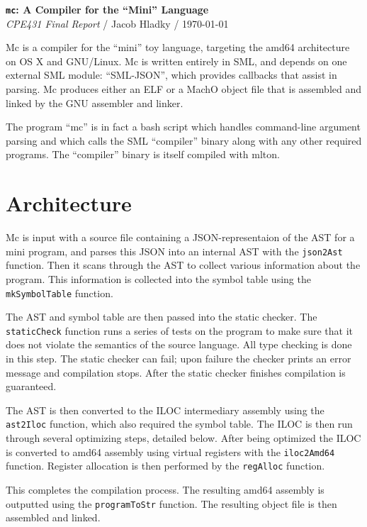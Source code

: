 \documentclass[12pt]{article}
\begin{document}
{\centering\Large
  \textbf{\texttt{mc}: A Compiler for the ``Mini'' Language}\\
         {\normalsize{\em CPE431 Final Report} / Jacob Hladky / \today}
         \par
}

\vspace{0.5cm}

Mc is a compiler for the ``mini'' toy language, targeting the amd64 architecture on OS X and GNU/Linux. Mc is written entirely in SML, and depends on one external SML module: ``SML-JSON'', which provides callbacks that assist in parsing. Mc produces either an ELF or a MachO object file that is assembled and linked by the GNU assembler and linker.

The program ``mc'' is in fact a bash script which handles command-line argument parsing and which calls the SML ``compiler'' binary along with any other required programs. The ``compiler'' binary is itself compiled with mlton.

\section*{Architecture}
Mc is input with a source file containing a JSON-representaion of the AST for a mini program, and parses this JSON into an internal AST with the \texttt{json2Ast} function. Then it scans through the AST to collect various information about the program. This information is collected into the symbol table using the \texttt{mkSymbolTable} function.

The AST and symbol table are then passed into the static checker. The \texttt{staticCheck} function runs a series of tests on the program to make sure that it does not violate the semantics of the source language. All type checking is done in this step. The static checker can fail; upon failure the checker prints an error message and compilation stops. After the static checker finishes compilation is guaranteed.

The AST is then converted to the ILOC intermediary assembly using the \texttt{ast2Iloc} function, which also required the symbol table. The ILOC is then run through several optimizing steps, detailed below. After being optimized the ILOC is converted to amd64 assembly using virtual registers with the \texttt{iloc2Amd64} function. Register allocation is then performed by the \texttt{regAlloc} function.

This completes the compilation process. The resulting amd64 assembly is outputted using the \texttt{programToStr} function. The resulting object file is then assembled and linked.
\end{document}
